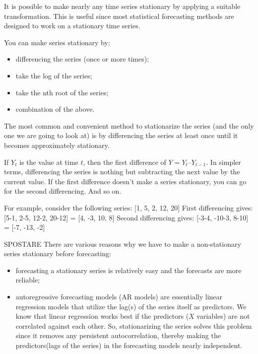 \documentclass[11pt]{article}
\providecommand{\tightlist}{%
      \setlength{\itemsep}{0pt}\setlength{\parskip}{0pt}}
\begin{document}
It is possible to make nearly any time series stationary by applying a
suitable transformation. This is useful since most statistical
forecasting methods are designed to work on a stationary time series.

You can make series stationary by:

\begin{itemize}
\tightlist
\item
  differencing the series (once or more times);
\item
  take the log of the series;
\item
  take the nth root of the series;
\item
  combination of the above.
\end{itemize}

The most common and convenient method to stationarize the series (and
the only one we are going to look at) is by differencing the series at
least once until it becomes approximately stationary.

If \(Y_t\) is the value at time \(t\), then the first difference of
\(Y = Y_t – Y_{t-1}\). In simpler terms, differencing the series is
nothing but subtracting the next value by the current value. If the
first difference doesn't make a series stationary, you can go for the
second differencing. And so on.

For example, consider the following series: {[}1, 5, 2, 12, 20{]} First
differencing gives: {[}5-1, 2-5, 12-2, 20-12{]} = {[}4, -3, 10, 8{]}
Second differencing gives: {[}-3-4, -10-3, 8-10{]} = {[}-7, -13, -2{]}

SPOSTARE There are various reasons why we have to make a non-stationary
series stationary before forecasting:

\begin{itemize}
\tightlist
\item
  forecasting a stationary series is relatively easy and the forecasts
  are more reliable;
\item
  autoregressive forecasting models (AR models) are essentially linear
  regression models that utilize the lag(s) of the series itself as
  predictors. We know that linear regression works best if the
  predictors (\(X\) variables) are not correlated against each other.
  So, stationarizing the series solves this problem since it removes any
  persistent autocorrelation, thereby making the predictors(lags of the
  series) in the forecasting models nearly independent.
\end{itemize}
\end{document}
